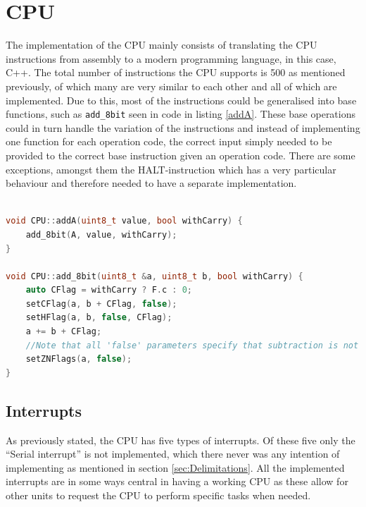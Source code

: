 \section{CPU}
\label{sec:CPUResults}
The implementation of the CPU mainly consists of translating the CPU instructions from assembly to a modern programming language, in this case, C++. The total number of instructions the CPU supports is 500 as mentioned previously, of which many are very similar to each other and all of which are implemented. Due to this, most of the instructions could be generalised into base functions, such as \texttt{add\_8bit} seen in code in listing \ref{addA}. These base operations could in turn handle the variation of the instructions and instead of implementing one function for each operation code, the correct input simply needed to be provided to the correct base instruction given an operation code. There are some exceptions, amongst them the HALT-instruction \cite{HALT-behaviour} which has a very particular behaviour and therefore needed to have a separate implementation.
\\\\
\begin{lstlisting}[language=C++,
caption = {Code displaying a generalised method used, in this case an addition function which allows for addition between register A and all other registers, both with and without the use of the carry bit.},
label = {addA}]
void CPU::addA(uint8_t value, bool withCarry) {
    add_8bit(A, value, withCarry);
}

void CPU::add_8bit(uint8_t &a, uint8_t b, bool withCarry) {
    auto CFlag = withCarry ? F.c : 0;
    setCFlag(a, b + CFlag, false);
    setHFlag(a, b, false, CFlag);
    a += b + CFlag;
    //Note that all 'false' parameters specify that subtraction is not used, which in turn affects how and which flags are set.
    setZNFlags(a, false);
}
\end{lstlisting}

\subsection{Interrupts}
As previously stated, the CPU has five types of interrupts. Of these five only the ``Serial interrupt'' is not implemented, which there never was any intention of implementing as mentioned in section \ref{sec:Delimitations}. All the implemented interrupts are in some ways central in having a working CPU as these allow for other units to request the CPU to perform specific tasks when needed.
\\\\
